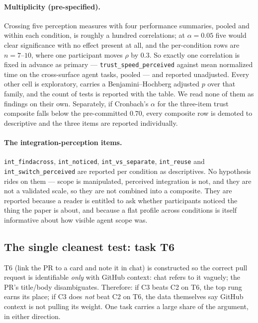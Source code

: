 \documentclass[11pt]{article}
\newcommand{\code}[1]{\texttt{#1}}
\begin{document}
\paragraph{Multiplicity (pre-specified).} Crossing five perception measures with
four performance summaries, pooled and within each condition, is roughly a
hundred correlations; at $\alpha = 0.05$ five would clear significance with no
effect present at all, and the per-condition rows are $n = 7$--$10$, where one
participant moves $\rho$ by $0.3$. So exactly one correlation is fixed in advance
as primary --- \code{trust\_speed\_perceived} against mean normalized time on the
cross-surface agent tasks, pooled --- and reported unadjusted. Every other cell is
exploratory, carries a Benjamini--Hochberg adjusted $p$ over that family, and the
count of tests is reported with the table. We read none of them as findings on
their own. Separately, if Cronbach's $\alpha$ for the three-item trust composite
falls below the pre-committed $0.70$, every composite row is demoted to
descriptive and the three items are reported individually.

\paragraph{The integration-perception items.} \code{int\_findacross},
\code{int\_noticed}, \code{int\_vs\_separate}, \code{int\_reuse} and
\code{int\_switch\_perceived} are reported per condition as descriptives. No
hypothesis rides on them --- scope is manipulated, perceived integration is not,
and they are not a validated scale, so they are not combined into a composite.
They are reported because a reader is entitled to ask whether participants
noticed the thing the paper is about, and because a flat profile across
conditions is itself informative about how visible agent scope was.

\subsection{The single cleanest test: task T6}\label{sec:t6}

T6 (link the PR to a card and note it in chat) is constructed so the correct
pull request is identifiable \emph{only} with GitHub context: chat refers to it
vaguely; the PR's title/body disambiguates. Therefore: if C3 beats C2 on T6, the
top rung earns its place; if C3 does \emph{not} beat C2 on T6, the data
themselves say GitHub context is not pulling its weight. One task carries a large
share of the argument, in either direction.
\end{document}
